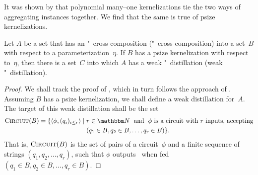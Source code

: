 It was shown by \textcite{bodlaender2009problems,bodlaender2014kernelization} that polynomial many--one kernelizations tie the two ways of aggregating instances together.
We find that the same is true of psize kernelizations.

\begin{theorem}
\label{thm:distillation}%
  Let $A$ be a set that has an "~cross-composition ("~cross-composition) into a set~$B$ with respect to a parameterization~$\eta$.
  If $B$ has a psize kernelization with respect to~$\eta$, then there is a set~$C$ into which $A$ has a weak "~distillation (weak "~distillation).
\end{theorem}
\begin{proof}
  We shall track the proof of \textcite[][Theorem~3.4]{bodlaender2014kernelization}, which in turn follows the approach of \textcite[][Lemma~2]{bodlaender2009problems}.
  Assuming $B$ has a psize kernelization, we shall define a weak distillation for~$A$.
  The target of this weak distillation shall be the set
  \begin{align*}
    \pr{Circuit}(B) \deq \{\pair{\phi}{(q_i)_{i \le r}} \st &r \in \bbN \reland \text{$\phi$ is a circuit with $r$ inputs, accepting} \\
      &(q_1 \in B, q_2 \in B, \ldots, q_r \in B)\}.
  \end{align*}
  That is, $\textnormal{\textsc{Circuit}}(B)$ is the set of pairs of a circuit~$\phi$ and a finite sequence of strings $(q_1, q_2, \ldots, q_r)$, such that $\phi$ outputs~ when fed $(q_1 \in B, q_2 \in B, \ldots, q_r \in B)$.


\end{proof}
